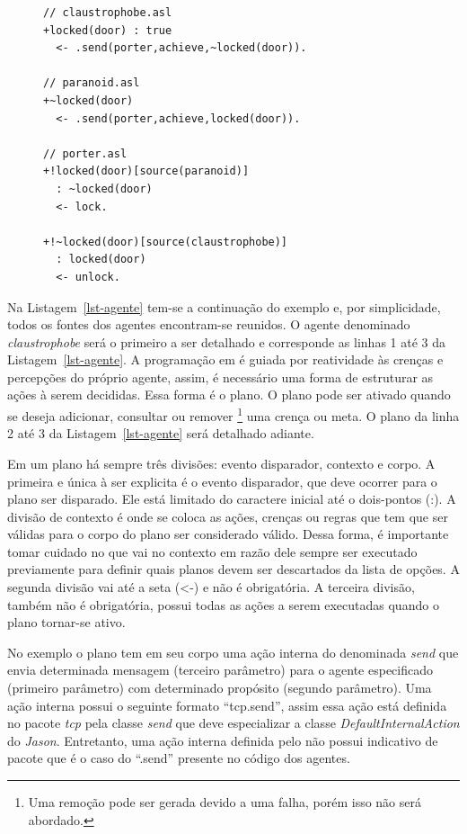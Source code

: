 \lstset{linewidth=75mm}
\begin{figure}
	\begin{lstlisting}[frame=trbl, caption=Agentes em ASL, label=lst-agente]
// claustrophobe.asl
+locked(door) : true
  <- .send(porter,achieve,~locked(door)).

// paranoid.asl
+~locked(door)
  <- .send(porter,achieve,locked(door)).

// porter.asl
+!locked(door)[source(paranoid)]
  : ~locked(door)
  <- lock.

+!~locked(door)[source(claustrophobe)]
  : locked(door)
  <- unlock.
	\end{lstlisting}
\end{figure}
%
Na Listagem~\ref{lst-agente} tem-se a continuação do exemplo e, por
simplicidade, todos os fontes dos agentes encontram-se reunidos. O agente denominado
\emph{claustrophobe} será o primeiro a ser detalhado e corresponde as linhas 1 até 3
da Listagem~\ref{lst-agente}. A programação em \jason é
guiada por reatividade às crenças e percepções do próprio agente, assim, é necessário
uma forma de estruturar as ações à serem decididas. Essa forma é o plano.
O plano pode ser ativado quando se deseja adicionar, consultar ou remover
\footnote{Uma remoção pode ser gerada devido a uma falha, porém isso não será
abordado.} uma crença ou meta. O plano da linha 2 até 3 da
Listagem~\ref{lst-agente} será detalhado adiante.

Em um plano há sempre três divisões: evento disparador, contexto e corpo.
A primeira e única à ser explicita é o evento disparador, que deve ocorrer para
o plano ser disparado. Ele está limitado do caractere inicial até
o dois-pontos (:). A divisão de contexto é onde se coloca as ações, crenças
ou regras que tem que ser válidas para o corpo do plano ser
considerado válido. Dessa forma, é
importante tomar cuidado no que vai no contexto em razão dele sempre ser
executado previamente para definir quais planos devem ser descartados da lista
de opções.
A segunda divisão vai até a seta (<-) e não é obrigatória.
A terceira divisão, também não é obrigatória, possui todas as ações a serem
executadas quando o plano tornar-se ativo.

No exemplo o plano tem em seu corpo
uma ação interna do \jason denominada \emph{send} que envia determinada
mensagem
(terceiro parâmetro) para o agente especificado (primeiro parâmetro) com
determinado propósito (segundo parâmetro). Uma ação interna possui o seguinte
formato ``tcp.send'', assim essa ação está definida no pacote \emph{tcp} pela
classe \emph{send} que deve especializar a classe \emph{DefaultInternalAction}
do \emph{Jason}. Entretanto, uma ação interna definida pelo \jason não possui
indicativo de pacote que é o caso do ``.send'' presente no código dos agentes.

